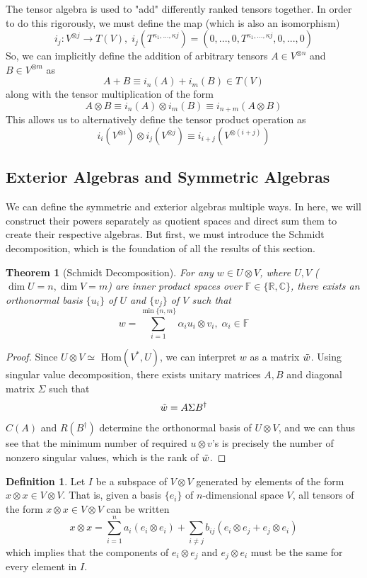 \documentclass{article}
\newtheorem{theorem}{Theorem}[section]
\theoremstyle{remark}
\theoremstyle{definition}
\newtheorem{definition}{Definition}[section]
\begin{document}
    The tensor algebra is used to "add" differently ranked tensors together. In order to do this rigorously, we must define the map (which is also an isomorphism)
    \[i_j: V^{\otimes j} \longrightarrow T(V), \; i_j (T^{\kappa_1, ..., \kappa j}) = (0, ...,0, T^{\kappa_1, ..., \kappa j}, 0, ..., 0) \]
    So, we can implicitly define the addition of arbitrary tensors $A \in V^{\otimes n}$ and $B \in V^{\otimes m}$ as 
    \[ A + B \equiv i_n (A) + i_m (B) \in T(V)\]
    along with the tensor multiplication of the form
    \[ A \otimes B \equiv i_n(A) \otimes i_m(B) \equiv i_{n+m} (A \otimes B)\]
    This allows us to alternatively define the tensor product operation as
    \[i_i(V^{\otimes i}) \otimes i_j( V^{\otimes j}) \equiv i_{i+j} (V^{\otimes (i+j)})\]

  \subsection{Exterior Algebras and Symmetric Algebras}

    We can define the symmetric and exterior algebras multiple ways. In here, we will construct their powers separately as quotient spaces and direct sum them to create their respective algebras. But first, we must introduce the Schmidt decomposition, which is the foundation of all the results of this section. 

    \begin{theorem}[Schmidt Decomposition]
    For any $w \in U \otimes V$, where $U, V$ ($\dim{U} = n, \dim{V} = m$)  are inner product spaces over $\mathbb{F} \in \{ \mathbb{R}, \mathbb{C}\}$, there exists an orthonormal basis $\{u_i\}$ of $U$ and $\{v_j\}$ of $V$ such that 
    \[ w = \sum_{i=1}^{\min{\{n, m\}}} \alpha_i u_i \otimes v_i, \; \alpha_i \in \mathbb{F}\]
    \end{theorem}
    \begin{proof}
    Since $U \otimes V \simeq $ Hom$(V^*, U)$, we can interpret $w$ as a matrix $\Tilde{w}$. Using singular value decomposition, there exists unitary matrices $A, B$ and diagonal matrix $\Sigma$ such that
    \[\Tilde{w} = A \Sigma B^\dagger\]
    $C(A)$ and $R(B^\dagger)$ determine the orthonormal basis of $U \otimes V$, and we can thus see that the minimum number of required $u \otimes v$'s is precisely the number of nonzero singular values, which is the rank of $\Tilde{w}$. 

    \end{proof}

    \begin{definition}
    Let $I$ be a subspace of $V \otimes V$ generated by elements of the form $x \otimes x \in V \otimes V$. That is, given a basis $\{e_i\}$ of $n$-dimensional space $V$, all tensors of the form $x \otimes x \in V \otimes V$ can be written 
    \[x \otimes x = \sum_{i=1}^n a_i (e_i \otimes e_i) + \sum_{i \neq j} b_{i j} (e_i \otimes e_j + e_j \otimes e_i)\]
    which implies that the components of $e_i \otimes e_j$ and $e_j \otimes e_i$ must be the same for every element in $I$. 
    \end{definition}
\end{document}
